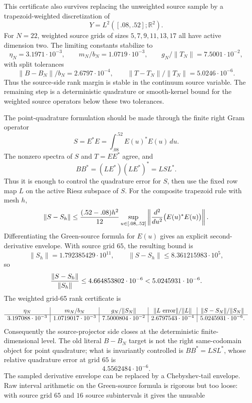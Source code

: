 \documentclass[11pt]{article}
\begin{document}
This certificate also survives replacing the unweighted source sample by a
trapezoid-weighted discretization of
\[
  Y=L^2([.08,.52];\mathbb R^2).
\]
For \(N=22\), weighted source grids of sizes \(5,7,9,11,13,17\) all have
active dimension two.  The limiting constants stabilize to
\[
  \eta_N=3.1971\cdot10^{-3},\qquad
  m_N/b_N=1.0719\cdot10^{-3},\qquad
  g_N/\|T_N\|=7.5001\cdot10^{-2},
\]
with split tolerances
\[
  \|B-B_N\|/b_N=2.6797\cdot10^{-4},\qquad
  \|T-T_N\|/\|T_N\|=5.0246\cdot10^{-6}.
\]
Thus the source-side rank margin is stable in the continuum source variable.
The remaining step is a deterministic quadrature or smooth-kernel bound for
the weighted source operators below these two tolerances.

The point-quadrature formulation should be made through the finite right Gram
operator
\[
  S=E^\ast E=\int_{.08}^{.52}E(u)^\ast E(u)\,du.
\]
The nonzero spectra of \(S\) and \(T=EE^\ast\) agree, and
\[
  BB^\ast=(LE^\ast)(LE^\ast)^\ast=L S L^\ast .
\]
Thus it is enough to control the quadrature error for \(S\), then use the fixed
row map \(L\) on the active Riesz subspace of \(S\).  For the composite
trapezoid rule with mesh \(h\),
\[
  \|S-S_h\|
  \le {(.52-.08)h^2\over 12}
      \sup_{u\in[.08,.52]}\left\|
      {d^2\over du^2}\bigl(E(u)^\ast E(u)\bigr)\right\|.
\]
Differentiating the Green-source formula for \(E(u)\) gives an explicit
second-derivative envelope.  With source grid \(65\), the resulting bound is
\[
  \|S_h\|=1.792385429\cdot10^{11},\qquad
  \|S-S_h\|\le8.361215983\cdot10^5,
\]
so
\[
  {\|S-S_h\|\over\|S_h\|}\le4.664853802\cdot10^{-6}
  <5.0245931\cdot10^{-6}.
\]
The weighted grid-65 rank certificate is
\[
\begin{array}{c|c|c|c|c}
\eta_N&m_N/b_N&g_N/\|S_N\|&
\|L{\rm\ error}\|/\|L\|&\|S-S_N\|/\|S_N\|\\\hline
3.197088\cdot10^{-3}&1.0719017\cdot10^{-3}&
7.5000804\cdot10^{-2}&2.6797543\cdot10^{-4}&5.0245931\cdot10^{-6}.
\end{array}
\]
Consequently the source-projector side closes at the deterministic
finite-dimensional level.  The old literal \(B-B_N\) target is not the right
same-codomain object for point quadrature; what is invariantly controlled is
\(BB^\ast=L S L^\ast\), whose relative quadrature error at grid \(65\) is
\[
  4.5562484\cdot10^{-6}.
\]
The sampled derivative envelope can be replaced by a Chebyshev-tail envelope.
Raw interval arithmetic on the Green-source formula is rigorous but too loose:
with source grid \(65\) and \(16\) source subintervals it gives the unusable
\end{document}
